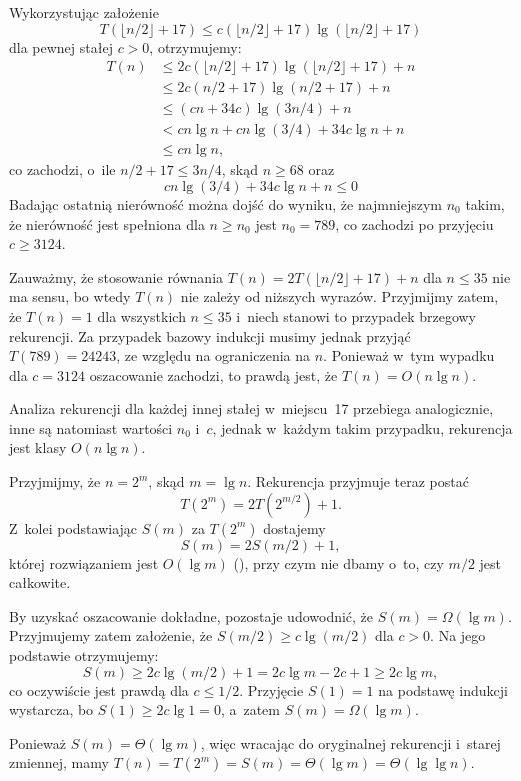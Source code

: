 \exercise %
Wykorzystując założenie
\[
	T(\lfloor n/2\rfloor+17) \le c(\lfloor n/2\rfloor+17)\lg(\lfloor n/2\rfloor+17)
\]
dla pewnej stałej $c>0$, otrzymujemy:
\begin{align*}
	T(n) &\le 2c(\lfloor n/2\rfloor+17)\lg(\lfloor n/2\rfloor+17)+n \\
	&\le 2c(n/2+17)\lg(n/2+17)+n \\
	&\le (cn+34c)\lg(3n/4)+n \\
	&< cn\lg n+cn\lg(3/4)+34c\lg n+n \\
	&\le cn\lg n,
\end{align*}
co zachodzi, o~ile $n/2+17\le 3n/4$, skąd $n\ge68$ oraz
\[
    cn\lg(3/4)+34c\lg n+n \le 0
\]
Badając ostatnią nierówność można dojść do wyniku, że najmniejszym $n_0$ takim, że nierówność jest spełniona dla $n\ge n_0$ jest $n_0=789$, co zachodzi po przyjęciu $c\ge3124$. 

Zauważmy, że stosowanie równania $T(n)=2T(\lfloor n/2\rfloor+17)+n$ dla $n\le35$ nie ma sensu, bo wtedy $T(n)$ nie zależy od niższych wyrazów. Przyjmijmy zatem, że $T(n)=1$ dla wszystkich $n\le35$ i~niech stanowi to przypadek brzegowy rekurencji. Za przypadek bazowy indukcji musimy jednak przyjąć $T(789)=24243$, ze względu na ograniczenia na $n$. Ponieważ w~tym wypadku dla $c=3124$ oszacowanie zachodzi, to prawdą jest, że $T(n)=O(n\lg n)$.

Analiza rekurencji dla każdej innej stałej w~miejscu~17 przebiega analogicznie, inne są natomiast wartości $n_0$ i~$c$, jednak w~każdym takim przypadku, rekurencja jest klasy $O(n\lg n)$.

\exercise %
Przyjmijmy, że $n=2^m$, skąd $m=\lg n$. Rekurencja przyjmuje teraz postać
\[
	T(2^m) = 2T(2^{m/2})+1.
\]
Z~kolei podstawiając $S(m)$ za $T(2^m)$ dostajemy
\[
	S(m) = 2S(m/2)+1,
\]
której rozwiązaniem jest $O(\lg m)$ (), przy czym nie dbamy o~to, czy $m/2$ jest całkowite.

By uzyskać oszacowanie dokładne, pozostaje udowodnić, że $S(m)=\Omega(\lg m)$. Przyjmujemy zatem założenie, że $S(m/2)\ge c\lg(m/2)$ dla $c>0$. Na jego podstawie otrzymujemy:
\[
	S(m) \ge 2c\lg(m/2)+1 = 2c\lg m-2c+1 \ge 2c\lg m,
\]
co oczywiście jest prawdą dla $c\le1/2$. Przyjęcie $S(1)=1$ na podstawę indukcji wystarcza, bo $S(1)\ge2c\lg1=0$, a~zatem $S(m)=\Omega(\lg m)$.

Ponieważ $S(m)=\Theta(\lg m)$, więc wracając do oryginalnej rekurencji i~starej zmiennej, mamy $T(n)=T(2^m)=S(m)=\Theta(\lg m)=\Theta(\lg\lg n)$.


